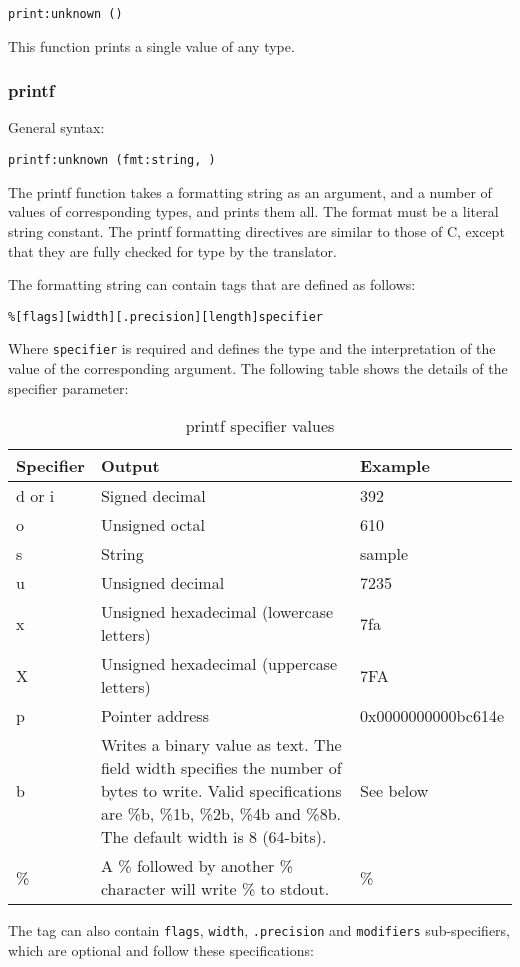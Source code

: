 \documentclass[twoside,english]{article}
\providecommand{\tabularnewline}{\\}
\newenvironment{vindent}
{\begin{list}{}{\setlength{\listparindent}{6pt}}
\item[]}
{\end{list}}
\begin{document}
\begin{vindent}
\begin{verbatim}
print:unknown ()
\end{verbatim}
\end{vindent}
This function prints a single value of any type.


\subsubsection{printf}
General syntax:

\begin{vindent}
\begin{verbatim}
printf:unknown (fmt:string, )
\end{verbatim}
\end{vindent}
The printf function takes a formatting string as an argument, and a number
of values of corresponding types, and prints them all. The format must be a
literal string constant. The printf formatting directives are similar to those
of C, except that they are fully checked for type by the translator.

The formatting string can contain tags that are defined as follows:

\begin{vindent}
\begin{verbatim}
%[flags][width][.precision][length]specifier
\end{verbatim}
\end{vindent}
Where \texttt{specifier} is required and defines the type and the interpretation
of the value of the corresponding argument. The following table shows the
details of the specifier parameter:

\begin{table}[H]
\caption{printf specifier values}
\begin{tabular}{|>{\raggedright}p{1in}|>{\raggedright}p{3.5in}|>{\raggedright}p{1.25in}|}
\hline
\textbf{Specifier}&
\textbf{Output}&
\textbf{Example}\tabularnewline
\hline
\hline 
d or i&
Signed decimal&
392\tabularnewline
\hline 
o&
Unsigned octal&
610\tabularnewline
\hline 
s&
String&
sample\tabularnewline
\hline 
u&
Unsigned decimal&
7235\tabularnewline
\hline 
x&
Unsigned hexadecimal (lowercase letters)&
7fa\tabularnewline
\hline 
X&
Unsigned hexadecimal (uppercase letters)&
7FA\tabularnewline
\hline 
p&
Pointer address&
0x0000000000bc614e\tabularnewline
\hline 
b&
Writes a binary value as text. The field width specifies the number of bytes
to write. Valid specifications are \%b, \%1b, \%2b, \%4b and \%8b. The default
width is 8 (64-bits).&
See below\tabularnewline
\hline 
\%&
A \% followed by another \% character will write \% to stdout.&
\%\tabularnewline
\hline
\end{tabular}
\end{table}
The tag can also contain \texttt{flags}, \texttt{width}, \texttt{.precision}
and \texttt{modifiers} sub-specifiers, which are optional and follow these
specifications:
\end{document}

